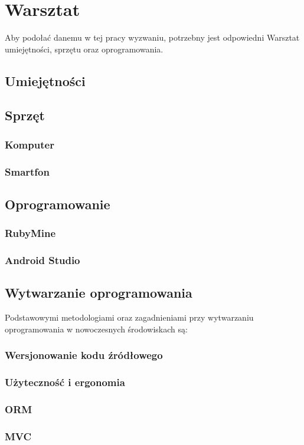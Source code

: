 \chapter{Warsztat}
Aby podołać danemu w tej pracy wyzwaniu, potrzebny jest odpowiedni Warsztat umiejętności, sprzętu oraz oprogramowania.
\section{Umiejętności}
\section{Sprzęt}
\subsection{Komputer}
\subsection{Smartfon}
\section{Oprogramowanie}
\subsection{RubyMine}
\subsection{Android Studio}

\section{Wytwarzanie oprogramowania}
Podstawowymi metodologiami oraz zagadnieniami przy wytwarzaniu oprogramowania w nowoczesnych środowiskach są:

\subsection{Wersjonowanie kodu źródłowego}
\subsection{Użyteczność i ergonomia}
\subsection{ORM}
\subsection{MVC}
